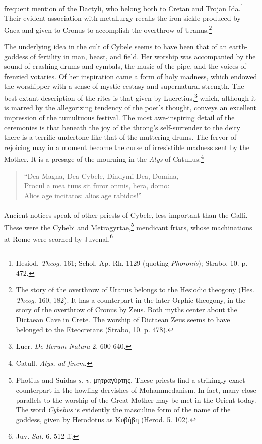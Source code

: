 \documentclass[a4paper, 12pt, oneside]{article}
\begin{document}
frequent mention of the Dactyli, who belong both to Cretan and Trojan Ida.\footnote{Hesiod. \emph{Theog.} 161; Schol. Ap. Rh. 1129 (quoting \emph{Phoronis}); Strabo, 10. p. 472.} Their evident association with metallurgy recalls the iron sickle produced by Gaea and given to Cronus to accomplish the overthrow of Uranus.\footnote{The story of the overthrow of Uranus belongs to the Hesiodic theogony (Hes. \emph{Theog.} 160, 182). It has a counterpart in the later Orphic theogony, in the story of the overthrow of Cronus by Zeus. Both myths center about the Dictaean Cave in Crete. The worship of Dictaean Zeus seems to have belonged to the Eteocretans (Strabo, 10. p. 478).}

The underlying idea in the cult of Cybele seems to have been that of an earth-goddess of fertility in man, beast, and field. Her worship was accompanied by the sound of crashing drums and cymbals, the music of the pipe, and the voices of frenzied votaries. Of her inspiration came a form of holy madness, which endowed the worshipper with a sense of mystic ecstasy and supernatural strength. The best extant description of the rites is that given by Lucretius,\footnote{Lucr. \emph{De Rerum Natura} 2. 600-640.} which, although it is marred by the allegorizing tendency of the poet's thought, conveys an excellent impression of the tumultuous festival. The most awe-inspiring detail of the ceremonies is that beneath the joy of the throng's self-surrender to the deity there is a terrific undertone like that of the muttering drums. The fervor of rejoicing may in a moment become the curse of irresistible madness sent by the Mother. It is a presage of the mourning in the \emph{Atys} of Catullus:\footnote{Catull. \emph{Atys, ad finem.}}
\begin{quote}
``Dea Magna, Dea Cybele, Dindymi Dea, Domina,\\Procul a mea tuus sit furor onmis, hera, domo:\\Alios age incitatos: alios age rabidos!''  
\end{quote}
\paragraph{}
Ancient notices speak of other priests of Cybele, less important than the Galli. These were the Cybebi and Metragyrtae,\footnote{Photius and Suidas \emph{s. v.} μητραγύρτης. These priests find a strikingly exact counterpart in the howling dervishes of Mohammedanism. In fact, many close parallels to the worship of the Great Mother may be met in the Orient today. The word \emph{Cybebus} is evidently the masculine form of the name of the goddess, given by Herodotus as Κυβήβη (Herod. 5. 102).} mendicant friars, whose machinations at Rome were scorned by Juvenal.\footnote{Juv. \emph{Sat.} 6. 512 ff.}
\end{document}
